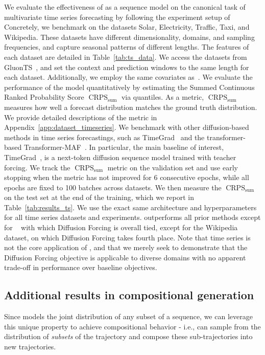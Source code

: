 
We evaluate the effectiveness of \algo{} as a sequence model on the canonical task of multivariate time series forecasting by following the experiment setup of ~\cite{salinas2019highdimensional, rasul2021multivariate, rasul2021autoregressive, tang2021probabilistic, yan2021scoregrad}
Concretely, we benchmark \algo{} on the datasets Solar, Electricity, Traffic, Taxi, and Wikipedia. These datasets have different dimensionality, domains, and sampling frequencies, and capture seasonal patterns of different lengths. The features of each dataset are detailed in Table~\ref{tab:ts_data}. We access the datasets from GluonTS~\cite{gluonts}, and set the context and prediction windows to the same length for each dataset. Additionally, we employ the same covariates as~\cite{rasul2021autoregressive}.
We evaluate the performance of the model quantitatively by estimating the Summed Continuous Ranked Probability Score $\operatorname{CRPS}_\text{sum}$ via quantiles. As a metric, $\operatorname{CRPS}_\text{sum}$ measures how well a forecast distribution matches the ground truth distribution.  We provide detailed descriptions of the metric in Appendix~\ref{app:dataset_timeseries}.
We benchmark with other diffusion-based methods in time series forecastings, such as TimeGrad~\cite{rasul2021autoregressive} and the transformer-based Transformer-MAF~\cite{rasul2021multivariate}. In particular, the main baseline of interest, TimeGrad~\cite{rasul2021autoregressive}, is a next-token diffusion sequence model trained with teacher forcing.
We track the $\operatorname{CRPS}_\text{sum}$ metric on the validation set and use early stopping when the metric has not improved for 6 consecutive epochs, while all epochs are fixed to 100 batches across datasets. We then measure the $\operatorname{CRPS}_\text{sum}$ on the test set at the end of the training, which we report in Table~\ref{tab:results_ts}. We use the exact same architecture and hyperparameters for all time series datasets and experiments.
\algo{} outperforms all prior methods except for ~\cite{yan2021scoregrad} with which Diffusion Forcing is overall tied, except for the Wikipedia dataset, on which Diffusion Forcing takes fourth place. 
Note that time series is not the core application of \algo{}, and that we merely seek to demonstrate that the Diffusion Forcing objective is applicable to diverse domains with no apparent trade-off in performance over baseline objectives. 

\subsection{Additional results in compositional generation}
\label{app:exp_compositionality}
Since \algo{} models the joint distribution of any subset of a sequence, we can leverage this unique property to achieve compositional behavior - i.e., \algo{} can sample from the distribution of \emph{subsets} of the trajectory and compose these sub-trajectories into new trajectories. 

